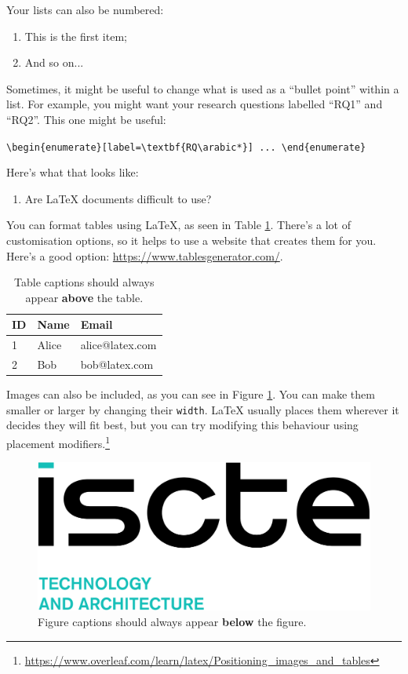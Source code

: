 \documentclass[12pt,reqno,twoside]{amsbook}
\begin{document}
\noindent Your lists can also be numbered:
\begin{enumerate}
    \item This is the first item;
    \item And so on...
\end{enumerate}

\noindent Sometimes, it might be useful to change what is used as a ``bullet point'' within a list. For example, you might want your research questions labelled ``RQ1'' and ``RQ2''. This one might be useful:

\begin{center}
    \verb|\begin{enumerate}[label=\textbf{RQ\arabic*}] ... \end{enumerate}|
\end{center}

\noindent Here's what that looks like:

\begin{enumerate}[label=\textbf{RQ\arabic*}] 
    \item Are LaTeX documents difficult to use?
\end{enumerate}

\noindent You can format tables using LaTeX, as seen in Table \ref{table:example}. There's a lot of customisation options, so it helps to use a website that creates them for you. Here's a good option: \url{https://www.tablesgenerator.com/}.

\begin{table}[h]
\caption{Table captions should always appear \textbf{above} the table.}
\begin{tabular}{l|l|l}
ID & Name  & Email           \\ \hline
1  & Alice & alice@latex.com \\
2  & Bob   & bob@latex.com  
\end{tabular}
\label{table:example}
\end{table}

Images can also be included, as you can see in Figure \ref{fig:example}. You can make them smaller or larger by changing their \texttt{width}. LaTeX usually places them wherever it decides they will fit best, but you can try modifying this behaviour using placement modifiers.\footnote{\url{https://www.overleaf.com/learn/latex/Positioning_images_and_tables}}

\begin{figure}
    \centering
    \includegraphics[width=0.3\linewidth]{images/ista.png}
    \caption{Figure captions should always appear \textbf{below} the figure.}
    \label{fig:example}
\end{figure}
\end{document}
